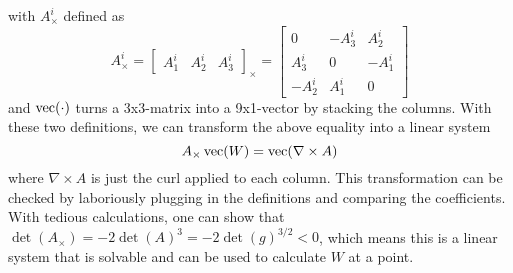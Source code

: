 \documentclass[../thesis.tex]{subfiles}
\begin{document}
with $A^i_{\times}$ defined as
$$A^i_{\times} = \begin{bmatrix}
  A^i_1 & A^i_2 & A^i_3
\end{bmatrix}_{\times} =
\begin{bmatrix}
  0 & -A^i_3 & A^i_2 \\
  A^i_3 & 0 & -A^i_1 \\
  -A^i_2 & A^i_1 & 0
\end{bmatrix}$$ and $\operatorname{vec}(\cdot)$ turns a 3x3-matrix into a 9x1-vector by stacking the columns.
With these two definitions, we can transform the above equality into a linear system
$$A_{\times} \operatorname{vec}(W) = \operatorname{vec} (\nabla \times A)$$
where $\nabla \times A$ is just the curl applied to each column. This transformation can be checked by laboriously plugging in the definitions and comparing the coefficients.
With tedious calculations, one can show that $\det(A_{\times})=-2\det(A)^3=-2\det(g)^{3/2}<0$, which
means this is a linear system that is solvable and can be used to calculate $W$ at a point.
\end{document}
